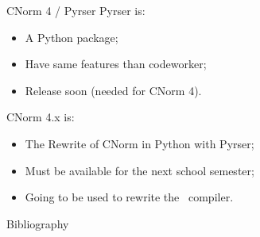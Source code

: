 \documentclass[xcolor={usenames,svgnames}]{beamer}
\begin{document}
\begin{frame}{CNorm 4 / Pyrser}
Pyrser is:
\begin{itemize}
\item A Python package;
\item Have same features than codeworker;
\item Release soon (needed for CNorm 4).
\end{itemize}
CNorm 4.x is:
\begin{itemize}
\item The Rewrite of CNorm in Python with Pyrser;
\item Must be available for the next school semester;
\item Going to be used to rewrite the \rtx\ compiler.
\end{itemize}
\end{frame}

\begin{frame}{Bibliography}
\rtxbibliography
\end{frame}
\end{document}
